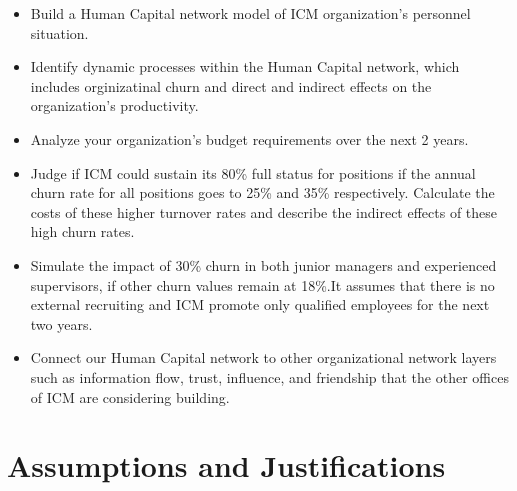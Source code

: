 \documentclass[12pt,a4paper,titlepage]{article}
\begin{document}
\begin{itemize}
\item Build a Human Capital network model of ICM organization’s
  personnel situation.

\item Identify dynamic processes within the Human Capital network,
  which includes orginizatinal churn and direct and indirect effects on
  the organization’s productivity.

\item Analyze your organization’s budget requirements over the next 2
  years.

\item Judge if ICM could sustain its 80\% full status for positions if
  the annual churn rate for all positions goes to 25\% and 35\%
  respectively. Calculate the costs of these higher turnover rates and
  describe the indirect effects of these high churn rates.

\item Simulate the impact of 30\% churn in both junior managers and
  experienced supervisors, if other churn values remain at 18\%.It
  assumes that there is no external recruiting and ICM promote only
  qualified employees for the next two years.

\item Connect our Human Capital network to other organizational
  network layers such as information flow, trust, influence, and
  friendship that the other offices of ICM are considering building.
\end{itemize}

\section{Assumptions and Justifications}
\label{sec:assumptions-and-justifications}
\end{document}
